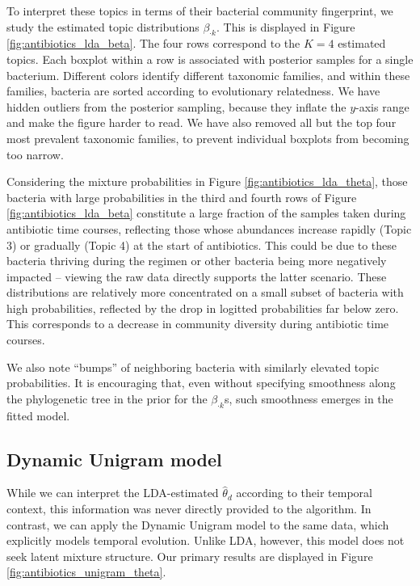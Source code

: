 \documentclass[oupdraft]{bio}
\begin{document}
To interpret these topics in terms of their bacterial community fingerprint, we study the
estimated topic distributions $\beta_{\cdot k}$. This is displayed in Figure
\ref{fig:antibiotics_lda_beta}. The four rows correspond to the $K = 4$
estimated topics. Each boxplot within a row is associated with posterior samples
for a single bacterium. Different colors identify different taxonomic families,
and within these families, bacteria are sorted according to evolutionary
relatedness. We have hidden outliers from the posterior sampling, because they
inflate the $y$-axis range and make the figure harder to read. We have also
removed all but the top four most prevalent taxonomic families, to prevent individual
boxplots from becoming too narrow.

Considering the mixture probabilities in Figure \ref{fig:antibiotics_lda_theta},
those bacteria with large probabilities in the third and fourth rows of Figure
\ref{fig:antibiotics_lda_beta} constitute a large fraction of the samples taken
during antibiotic time courses, reflecting those whose abundances increase
rapidly (Topic 3) or gradually (Topic 4) at the start of antibiotics. This could
be due to these bacteria thriving during the regimen or other bacteria being
more negatively impacted -- viewing the raw data directly supports the latter
scenario. These distributions are relatively more concentrated on a small subset
of bacteria with high probabilities, reflected by the drop in logitted
probabilities far below zero. This corresponds to a decrease in community
diversity during antibiotic time courses.

We also note ``bumps'' of neighboring bacteria with similarly elevated topic
probabilities. It is encouraging that, even without specifying smoothness along
the phylogenetic tree in the prior for the $\beta_{\cdot k}$s, such smoothness
emerges in the fitted model.

\subsection{Dynamic Unigram model}
\label{sec:antibiotics_unigram}

While we can interpret the LDA-estimated $\hat{\theta}_{d}$ according to their
temporal context, this information was never directly provided to the algorithm.
In contrast, we can apply the Dynamic Unigram model to the same data, which
explicitly models temporal evolution. Unlike LDA, however, this model does not
seek latent mixture structure. Our primary results are displayed in Figure
\ref{fig:antibiotics_unigram_theta}.
\end{document}

